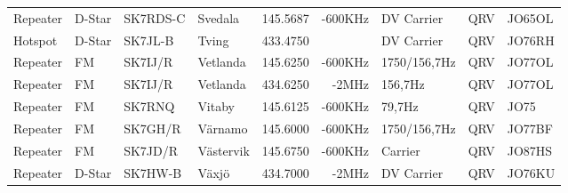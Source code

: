 \begin{landscape}
\begin{longtable}{llllrrlcl}
	Repeater          & D-Star       & SK7RDS-C      & Svedala             &          145.5687 &        -600KHz & DV Carrier      &       QRV       & JO65OL           \\
	Hotspot           & D-Star       & SK7JL-B       & Tving               &          433.4750 &                & DV Carrier      &       QRV       & JO76RH           \\
	Repeater          & FM           & SK7IJ/R       & Vetlanda            &          145.6250 &        -600KHz & 1750/156,7Hz    &       QRV       & JO77OL           \\
	Repeater          & FM           & SK7IJ/R       & Vetlanda            &          434.6250 &          -2MHz & 156,7Hz         &       QRV       & JO77OL           \\
	Repeater          & FM           & SK7RNQ        & Vitaby              &          145.6125 &        -600KHz & 79,7Hz          &       QRV       & JO75             \\
	Repeater          & FM           & SK7GH/R       & Värnamo             &          145.6000 &        -600KHz & 1750/156,7Hz    &       QRV       & JO77BF           \\
	Repeater          & FM           & SK7JD/R       & Västervik           &          145.6750 &        -600KHz & Carrier         &       QRV       & JO87HS           \\
	Repeater          & D-Star       & SK7HW-B       & Växjö               &          434.7000 &          -2MHz & DV Carrier      &       QRV       & JO76KU
\end{longtable}
\normalsize

\end{landscape}
